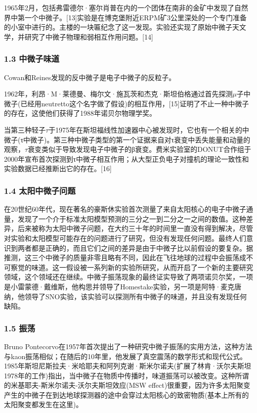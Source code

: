 1965年2月，包括弗雷德尔·塞尔肖普在内的一个团体在南非的金矿中发现了自然界中第一个中微子。[13]实验是在博克堡附近ERPM矿3公里深处的一个专门准备的小室中进行的。主楼的一块匾纪念了这一发现。实验还实现了原始中微子天文学，并研究了中微子物理和弱相互作用问题。[14]

\subsubsection{1.3 中微子味道}
Cowan和Reines发现的反中微子是电子中微子的反粒子。

1962年，利昂·M·莱德曼、梅尔文·施瓦茨和杰克·斯坦伯格通过首先探测$\mu$子中微子(已经用neutretto这个名字做了假设)的相互作用，[15]证明了不止一种中微子的存在，这使他们获得了1988年诺贝尔物理学奖。

当第三种轻子$\tau$于1975年在斯坦福线性加速器中心被发现时，它也有一个相关的中微子(τ中微子)。第三种中微子类型的第一个证据来自对τ衰变中丢失能量和动量的观察，$\tau$衰变类似于导致发现电子中微子的β衰变。费米实验室的DONUT合作组于2000年宣布首次探测到τ中微子相互作用；从大型正负电子对撞机的理论一致性和实验数据已经推断出它的存在。[16]

\subsubsection{1.4 太阳中微子问题}
在20世纪60年代，现在著名的豪斯休实验首次测量了来自太阳核心的电子中微子通量，发现了一个介于标准太阳模型预测的三分之一到二分之一之间的数值。这种差异，后来被称为太阳中微子问题，在大约三十年的时间里一直没有得到解决，尽管对实验和太阳模型可能存在的问题进行了研究，但没有发现任何问题。最终人们意识到两者都是正确的，而且它们之间的差异是由于中微子比以前假设的要复杂。据推测，这三个中微子的质量非零且略有不同，因此在飞往地球的过程中会振荡成不可察觉的味道。这一假设被一系列新的实验所研究，从而开启了一个新的主要研究领域，这个领域还在继续。中微子振荡现象的最终证实导致了两项诺贝尔奖，一项是小雷蒙德·戴维斯，他构思并领导了Homestake实验，另一项是阿特·麦克唐纳，他领导了SNO实验，该实验可以探测所有中微子的味道，并且没有发现任何缺陷。

\subsubsection{1.5 振荡}
Bruno Pontecorvo在1957年首次提出了一种研究中微子振荡的实用方法，这种方法与kaon振荡相似；在随后的10年里，他发展了真空震荡的数学形式和现代公式。1985年斯坦尼斯拉夫·米哈耶夫和阿列克谢·斯米尔诺夫(扩展了林肯·沃尔夫斯坦1978年的工作)指出，当中微子在物质中传播时，味道振荡可以被改变。这种所谓的米基耶夫-斯米尔诺夫-沃尔夫斯坦效应(MSW effect)很重要，因为许多太阳聚变产生的中微子在到达地球探测器的途中会穿过太阳核心的致密物质(基本上所有的太阳聚变都发生在这里)。

